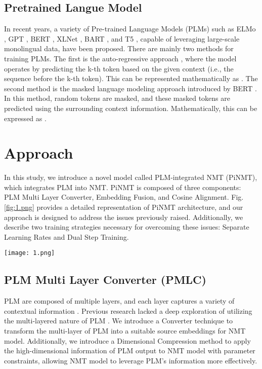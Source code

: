 \documentclass[conference]{IEEEtran}
\begin{document}
\subsection{Pretrained Langue Model}
In recent years, a variety of Pre-trained Language Models (PLMs) such as ELMo \cite{peters2018elmo}, GPT \cite{radford2018gpt}, BERT \cite{devlin2019bert}, XLNet \cite{yang2019xlnet}, BART \cite{lewis2019bart}, and T5 \cite{raffel2020texttotext}, capable of leveraging large-scale monolingual data, have been proposed. There are mainly two methods for training PLMs. 
The first is the auto-regressive approach \cite{radford2018gpt}, where the model operates by predicting the k-th token  based on the given context  (i.e., the sequence before the k-th token). This can be represented mathematically as .
The second method is the masked language modeling approach introduced by BERT \cite{devlin2019bert}. In this method, random tokens are masked, and these masked tokens are predicted using the surrounding context information. Mathematically, this can be expressed as .






\section{Approach}
In this study, we introduce a novel model called PLM-integrated NMT (PiNMT), which integrates PLM into NMT. PiNMT is composed of three components: PLM Multi Layer Converter, Embedding Fusion, and Cosine Alignment. Fig. \ref{fig:1.png} provides a detailed representation of PiNMT architecture, and our approach is designed to address the issues previously raised. Additionally, we describe two training strategies necessary for overcoming these issues: Separate Learning Rates and Dual Step Training.

\begin{figure*}[tb]
  \centering
  \texttt{[image: 1.png]}
  \caption{The architecture of the PiNMT model}
  \label{fig:1.png}
\end{figure*}



\subsection{PLM Multi Layer Converter (PMLC)}
PLM are composed of multiple layers, and each layer captures a variety of contextual information \cite{peters2018elmo, jawahar2019does}. Previous research lacked a deep exploration of utilizing the multi-layered nature of PLM \cite{edunov2019pretrained, xu2021bibert}. We introduce a Converter technique to transform the multi-layer of PLM into a suitable source embeddings for NMT model. Additionally, we introduce a Dimensional Compression method to apply the high-dimensional information of PLM output to NMT model with parameter constraints, allowing NMT model to leverage PLM's information more effectively.
\end{document}
